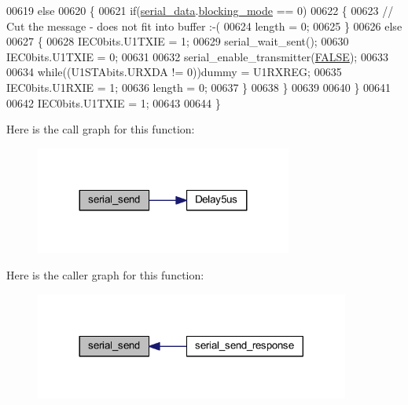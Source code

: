 \begin{DoxyCode}
00619         \textcolor{keywordflow}{else}
00620         \{
00621             \textcolor{keywordflow}{if}(\hyperlink{a00030_a77d3b77ccd59a0065642bf1ac7887b9d}{serial\_data}.\hyperlink{a00030_a758ac775caab1899af08024d4635f7e3}{blocking\_mode} == 0)
00622             \{
00623                 \textcolor{comment}{// Cut the message - does not fit into buffer :-(}
00624                 length = 0;
00625             \}
00626             \textcolor{keywordflow}{else}
00627             \{
00628                 IEC0bits.U1TXIE   = 1;
00629                 serial\_wait\_sent();
00630                 IEC0bits.U1TXIE   = 0;
00631 
00632                 serial\_enable\_transmitter(\hyperlink{a00040_aa93f0eb578d23995850d61f7d61c55c1}{FALSE});
00633 
00634                 \textcolor{keywordflow}{while}((U1STAbits.URXDA != 0))dummy = U1RXREG;
00635                 IEC0bits.U1RXIE   = 1;
00636                 length = 0;
00637             \}
00638         \}
00639 
00640     \}
00641 
00642     IEC0bits.U1TXIE   = 1;
00643 
00644 \}
\end{DoxyCode}


Here is the call graph for this function\+:
\nopagebreak
\begin{figure}[H]
\begin{center}
\leavevmode
\includegraphics[width=239pt]{df/d61/a00031_a17f65cf9dbacdfb97cb2536ed0097ccb_cgraph}
\end{center}
\end{figure}




Here is the caller graph for this function\+:
\nopagebreak
\begin{figure}[H]
\begin{center}
\leavevmode
\includegraphics[width=293pt]{df/d61/a00031_a17f65cf9dbacdfb97cb2536ed0097ccb_icgraph}
\end{center}
\end{figure}


